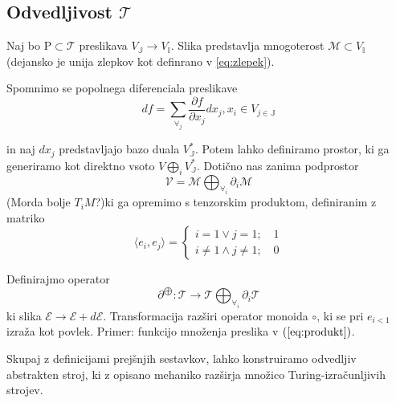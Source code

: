 \documentclass{article}
\newcommand{\II}{\mathbb{I}}
\newcommand{\JJ}{\mathbb{J}}
\newcommand{\E}{\mathcal{E}}
\newcommand{\T}{\mathcal{T}}
\begin{document}
\subsection{Odvedljivost $\T$}
Naj bo $\mathrm{P}\subset\T$ preslikava $V_\JJ\to V_\II$. Slika predstavlja mnogoterost $\mathcal{M}\subset V_\II$ (dejansko je unija zlepkov kot definrano v \ref{eq:zlepek}).

Spomnimo se popolnega diferenciala preslikave
$$df=\sum_{\forall_j}\frac{\partial f}{\partial x_j}dx_j, x_i\in V_{j\in\JJ}$$


in naj $dx_j$ predstavljajo bazo duala $V_\JJ^{*}$. Potem lahko definiramo prostor, ki ga generiramo kot direktno vsoto $V\bigoplus_i V_\JJ^*$. Dotično nas zanima podprostor
$$\mathcal{V}=\mathcal{M}\bigoplus_{\forall_i}\partial_i\mathcal{M}$$
(Morda bolje $T_iM$?)ki ga opremimo s tenzorskim produktom, definiranim z matriko
\begin{equation}\label{eq:produkt}
\langle e_i, e_j\rangle =
  \begin{cases}
    i=1\lor j=1;\quad 1\\
    i\ne1\land j\ne 1;\quad 0
  \end{cases}
\end{equation}
  
  Definirajmo operator 
  \begin{equation}\label{eq:dirSumFun}
  \partial^{\bigoplus}:\T\to\T\bigoplus_{\forall_i}\partial_i\T
  \end{equation}
  ki slika $\E\to\E+d\E$. Transformacija razširi operator monoida $\circ$, ki se pri $e_{i<1}$ izraža kot povlek. Primer: funkcijo množenja preslika v $(\ref{eq:produkt})$. 
  
  Skupaj z definicijami prejšnjih sestavkov, lahko konstruiramo odvedljiv abstrakten stroj, ki z opisano mehaniko razširja množico Turing-izračunljivih strojev.
  
\end{document}
